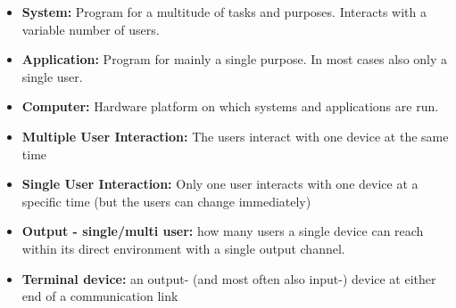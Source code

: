 \documentclass{acm_proc_article-sp}
\begin{document}
\begin{itemize}
\item \textbf{System:} Program for a multitude of tasks and purposes. Interacts with a variable number of users.
\item \textbf{Application:} Program for mainly a single purpose. In most cases also only a single user.
\item \textbf{Computer:} Hardware platform on which systems and applications are run.
\item \textbf{Multiple User Interaction:} The users interact with one device at the same time 
\item \textbf{Single User Interaction:} Only one user interacts with one device  at a specific time (but the users can change immediately)
\item \textbf{Output - single/multi user:} how many users a single device can reach within its direct environment with a single output channel.
\item \textbf{Terminal device:} an output- (and most often also input-) device at either end of a communication link
\end{itemize}

\balancecolumns
\end{document}
